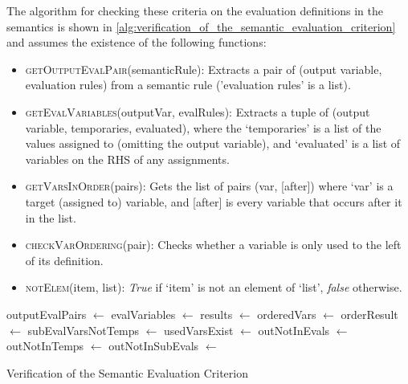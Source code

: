 The algorithm for checking these criteria on the evaluation definitions in the semantics is shown in \autoref{alg:verification_of_the_semantic_evaluation_criterion} and assumes the existence of the following functions:
\begin{itemize}
    \item \textsc{getOutputEvalPair}(semanticRule): Extracts a pair of (output variable, evaluation rules) from a semantic rule ('evaluation rules' is a list). 
    \item \textsc{getEvalVariables}(outputVar, evalRules): Extracts a tuple of (output variable, temporaries, evaluated), where the `temporaries' is a list of the values assigned to (omitting the output variable), and `evaluated' is a list of variables on the RHS of any assignments.
    \item \textsc{getVarsInOrder}(pairs): Gets the list of pairs (var, [after]) where `var' is a target (assigned to) variable, and [after] is every variable that occurs after it in the list.
    \item \textsc{checkVarOrdering}(pair): Checks whether a variable is only used to the left of its definition.
    \item \textsc{notElem}(item, list): \textit{True} if `item' is not an element of `list', \textit{false} otherwise. 
\end{itemize}

\begin{algorithm}
\begin{algorithmic}
    \State outputEvalPairs $\gets$ 
    \State evalVariables $\gets$ 
    \State results $\gets$ 
    \State orderedVars $\gets$ 
    \State orderResult $\gets$ 
        \State {}
    \Else
        \State {}
    \EndIf
\EndFunction
\State
{}
    \State subEvalVarsNotTemps $\gets$ 
    \State usedVarsExist $\gets$ 
    \State outNotInEvals $\gets$ 
    \State outNotInTemps $\gets$ 
    \State outNotInSubEvals $\gets$ 
    \State {}
\EndFunction
\end{algorithmic}
\caption{Verification of the Semantic Evaluation Criterion}
\label{alg:verification_of_the_semantic_evaluation_criterion}
\end{algorithm}

